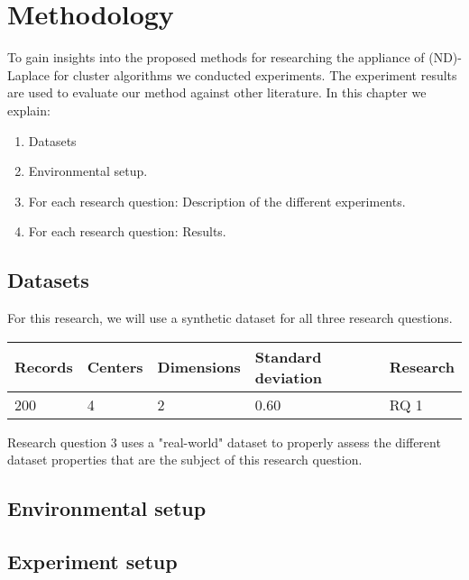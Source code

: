 \chapter{Methodology}

To gain insights into the proposed methods for researching the appliance of (ND)-Laplace for cluster algorithms we conducted experiments.
The experiment results are used to evaluate our method against other literature.
In this chapter we explain:
\begin{enumerate}

  \item Datasets
  \item Environmental setup.
  \item For each research question: Description of the different experiments.
  \item For each research question: Results.
\end{enumerate}

\section{Datasets}
For this research, we will use a synthetic dataset for all three research questions.
\begin{table}[h]
  \begin{tabular}{@{}lllll@{}}
    \toprule
    Records & Centers & Dimensions & Standard deviation & Research \\ \midrule
    200     & 4       & 2          & 0.60               & RQ 1     \\ \bottomrule
  \end{tabular}
\end{table}

Research question 3 uses a "real-world" dataset to properly assess the different dataset properties that are the subject of this research question.

\section{Environmental setup}
\section{Experiment setup}
